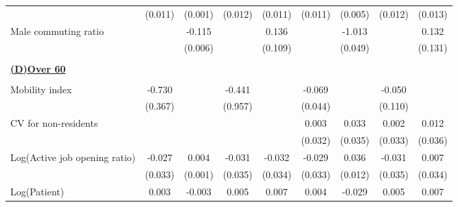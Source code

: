 \begin{tabular}{l*{8}{c}}
                    &     (0.011)         &     (0.001)         &     (0.012)         &     (0.011)         &     (0.011)         &     (0.005)         &     (0.012)         &     (0.013)         \\
\addlinespace
Male commuting ratio&                     &      -0.115\sym{***}&                     &       0.136         &                     &      -1.013\sym{***}&                     &       0.132         \\
                    &                     &     (0.006)         &                     &     (0.109)         &                     &     (0.049)         &                     &     (0.131)         \\
\hline \\ \multicolumn{9}{l}{\textbf{\underline{(D)Over 60}}} \\\\[-1ex]
Mobility index      &      -0.730\sym{**} &                     &      -0.441         &                     &      -0.069         &                     &      -0.050         &                     \\
                    &     (0.367)         &                     &     (0.957)         &                     &     (0.044)         &                     &     (0.110)         &                     \\
\addlinespace
CV for non-residents&                     &                     &                     &                     &       0.003         &       0.033         &       0.002         &       0.012         \\
                    &                     &                     &                     &                     &     (0.032)         &     (0.035)         &     (0.033)         &     (0.036)         \\
\addlinespace
Log(Active job opening ratio)&      -0.027         &       0.004\sym{***}&      -0.031         &      -0.032         &      -0.029         &       0.036\sym{***}&      -0.031         &       0.007         \\
                    &     (0.033)         &     (0.001)         &     (0.035)         &     (0.034)         &     (0.033)         &     (0.012)         &     (0.035)         &     (0.034)         \\
\addlinespace
Log(Patient)        &       0.003         &      -0.003\sym{***}&       0.005         &       0.007         &       0.004         &      -0.029\sym{***}&       0.005         &       0.007         \\

\end{tabular}
